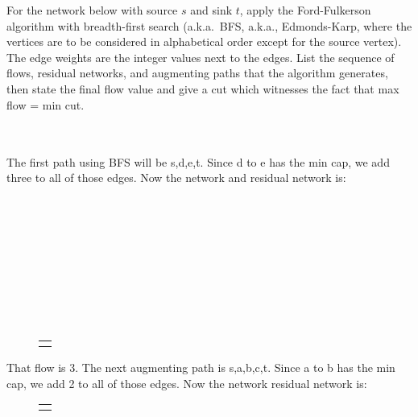 \documentclass[12pt]{article}
\newenvironment{exercise}[2][Exercise]{\begin{trivlist}
		\item[\hskip \labelsep {\bfseries #1}\hskip \labelsep {\bfseries #2.}]}{\end{trivlist}}
\begin{document}
	\begin{exercise}{1} For the network below with source $s$ and sink $t$, apply the Ford-Fulkerson algorithm with breadth-first search (a.k.a.~BFS, a.k.a., Edmonds-Karp, where the vertices are to be considered in alphabetical order except for the source vertex).  The edge weights are the integer values next to the edges.  List the sequence of flows, residual networks, and augmenting paths that the algorithm generates, then state the final flow value and give a cut which witnesses the fact that max flow = min cut.
		\begin{figure}[h]
			\begin{center}
				\begin{tabular}{c}
					
				\end{tabular}
			\end{center}
		\end{figure}
		\\The first path using BFS will be s,d,e,t. Since d to e has the min cap, we add three to all of those edges. Now the network and residual network is:\\\\\\\\\\\\\\\\\\\\
		\begin{figure}[h]
			\begin{center}
				\begin{tabular}{c}
					\qquad
					
				\end{tabular}
			\end{center}
		\end{figure}
		
		That flow is 3. The next augmenting path is s,a,b,c,t. Since a to b has the min cap, we add 2 to all of those edges. Now the network residual network is:
		\begin{figure}[h]
			\begin{center}
				\begin{tabular}{c}
					\qquad
					
				\end{tabular}
			\end{center}
		\end{figure}
		

\end{exercise}
\end{document}
